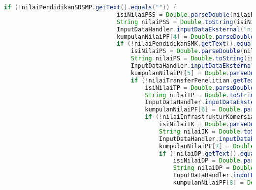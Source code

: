 \begin{lstlisting}[language=Java, caption=TampilanKondisiEksternal.java]
                            if (!nilaiPendidikanSDSMP.getText().equals("")) {
                                isiNilaiPSS = Double.parseDouble(nilaiPendidikanSDSMP.getText()) / 100.0;
                                String nilaiPSS = Double.toString(isiNilaiPSS);
                                InputDataHandler.inputDataEksternal("nilaiPendidikanSDSMP", nilaiPSS);
                                kumpulanNilaiPF[4] = Double.parseDouble(InputDataHandler.getValue("nilaiPendidikanSDSMP"));
                                if (!nilaiPendidikanSMK.getText().equals("")) {
                                    isiNilaiPS = Double.parseDouble(nilaiPendidikanSMK.getText()) / 100.0;
                                    String nilaiPS = Double.toString(isiNilaiPS);
                                    InputDataHandler.inputDataEksternal("nilaiPendidikanSMK", nilaiPS);
                                    kumpulanNilaiPF[5] = Double.parseDouble(InputDataHandler.getValue("nilaiPendidikanSMK"));
                                    if (!nilaiTransferPenelitian.getText().equals("")) {
                                        isiNilaiTP = Double.parseDouble(nilaiTransferPenelitian.getText()) / 100.0;
                                        String nilaiTP = Double.toString(isiNilaiTP);
                                        InputDataHandler.inputDataEksternal("nilaiTransferPenelitian", nilaiTP);
                                        kumpulanNilaiPF[6] = Double.parseDouble(InputDataHandler.getValue("nilaiTransferPenelitian"));
                                        if (!nilaiInfrastrukturKomersial.getText().equals("")) {
                                            isiNilaiIK = Double.parseDouble(nilaiInfrastrukturKomersial.getText()) / 100.0;
                                            String nilaiIK = Double.toString(isiNilaiIK);
                                            InputDataHandler.inputDataEksternal("nilaiInfrastrukturKomersial", nilaiIK);
                                            kumpulanNilaiPF[7] = Double.parseDouble(InputDataHandler.getValue("nilaiInfrastrukturKomersial"));
                                            if (!nilaiDP.getText().equals("")) {
                                                isiNilaiDP = Double.parseDouble(nilaiDP.getText()) / 100.0;
                                                String nilaiDP = Double.toString(isiNilaiDP);
                                                InputDataHandler.inputDataEksternal("DinamikaPasar", nilaiDP);
                                                kumpulanNilaiPF[8] = Double.parseDouble(InputDataHandler.getValue("DinamikaPasar"));

\end{lstlisting}
